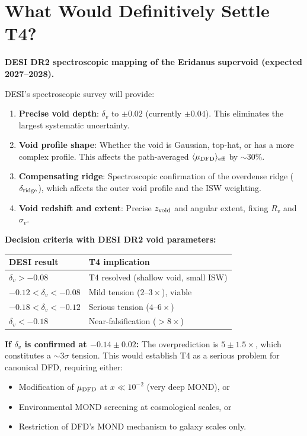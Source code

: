 \documentclass[11pt,a4paper]{article}
\newcommand{\mufd}{\mu_{\rm DFD}}
\begin{document}
\section{What Would Definitively Settle T4?}

\begin{tcolorbox}[colback=green!5!white, colframe=green!60!black,
  title=\textbf{The T4 Decision Experiment}]

\textbf{DESI DR2 spectroscopic mapping of the Eridanus supervoid
(expected 2027--2028).}

DESI's spectroscopic survey will provide:
\begin{enumerate}
\item \textbf{Precise void depth}: $\delta_v$ to $\pm 0.02$ (currently
  $\pm 0.04$). This eliminates the largest systematic uncertainty.

\item \textbf{Void profile shape}: Whether the void is Gaussian,
  top-hat, or has a more complex profile. This affects the
  path-averaged $\langle\mufd\rangle_{\rm eff}$ by $\sim 30\%$.

\item \textbf{Compensating ridge}: Spectroscopic confirmation of
  the overdense ridge ($\delta_{\rm ridge}$), which affects the
  outer void profile and the ISW weighting.

\item \textbf{Void redshift and extent}: Precise $z_{\rm void}$
  and angular extent, fixing $R_v$ and $\sigma_v$.
\end{enumerate}

\textbf{Decision criteria with DESI DR2 void parameters:}
\begin{center}
\begin{tabular}{ll}
\toprule
\textbf{DESI result} & \textbf{T4 implication} \\
\midrule
$\delta_v > -0.08$ & T4 resolved (shallow void, small ISW) \\
$-0.12 < \delta_v < -0.08$ & Mild tension ($2$--$3\times$), viable \\
$-0.18 < \delta_v < -0.12$ & Serious tension ($4$--$6\times$) \\
$\delta_v < -0.18$ & Near-falsification ($>8\times$) \\
\bottomrule
\end{tabular}
\end{center}

\textbf{If $\delta_v$ is confirmed at $-0.14 \pm 0.02$:}
The overprediction is $5 \pm 1.5\times$, which constitutes a
$\sim 3\sigma$ tension. This would establish T4 as a serious
problem for canonical DFD, requiring either:
\begin{itemize}[nosep]
\item Modification of $\mufd$ at $x \ll 10^{-2}$ (very deep MOND), or
\item Environmental MOND screening at cosmological scales, or
\item Restriction of DFD's MOND mechanism to galaxy scales only.
\end{itemize}

\end{tcolorbox}
\end{document}
